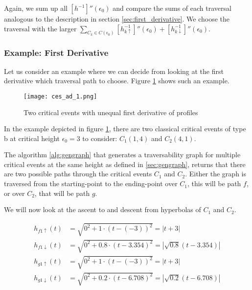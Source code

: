 Again, we sum up all $[h^{-1}]''(\epsilon_0)$ and compare the sums of each traversal analogous to the description in section \ref{sec:first_derivative}. We choose the traversal with the larger $\sum\nolimits_{C_k \in C(\epsilon_0)}[h_{k\uparrow}^{-1}]''(\epsilon_0) + [h_{k\downarrow}^{-1}]''(\epsilon_0)$.

\subsubsection{Example: First Derivative}

Let us consider an example where we can decide from looking at the first derivative which traversal path to choose. Figure \ref{fig:ces_ad_1} shows such an example.

 \begin{figure}[H]
    \centering
    
    \texttt{[image: ces\_ad\_1.png]}
		
	\caption{Two critical events with unequal first derivative of profiles\protect\footnotemark}
    \label{fig:ces_ad_1}
\end{figure}

In the example depicted in figure \ref{fig:ces_ad_1}, there are two classical critical events of type b at critical height $\epsilon_0 = 3$ to consider: $C_1(1, 4)$ and $C_2(4, 1)$.

The algorithm \ref{alg:gengraph} that generates a traversability graph for multiple critical events at the same height as defined in \ref{sec:gengraph}, returns that there are two possible paths through the critical events $C_1$ and $C_2$. Either the graph is traversed from the starting-point to the ending-point over $C_1$, this will be path $f$, or over $C_2$, that will be path $g$.

We will now look at the ascent to and descent from hyperbolas of $C_1$ and $C_2$.


\begin{align*}
	h_{f1\uparrow}(t) &= \sqrt{0^2 + 1\cdot(t - (-3))^2} = \left| t + 3 \right|\\
	h_{f1\downarrow}(t) &= \sqrt{0^2 + 0.8\cdot(t - 3.354)^2} = \left| \sqrt{0.8}(t - 3.354) \right|\\
	h_{g1\uparrow}(t) &= \sqrt{0^2 + 1\cdot(t - (-3))^2} = \left| t + 3 \right|\\
	h_{g1\downarrow}(t) &= \sqrt{0^2 + 0.2\cdot(t - 6.708)^2} = \left| \sqrt{0.2}(t - 6.708) \right|
\end{align*}

